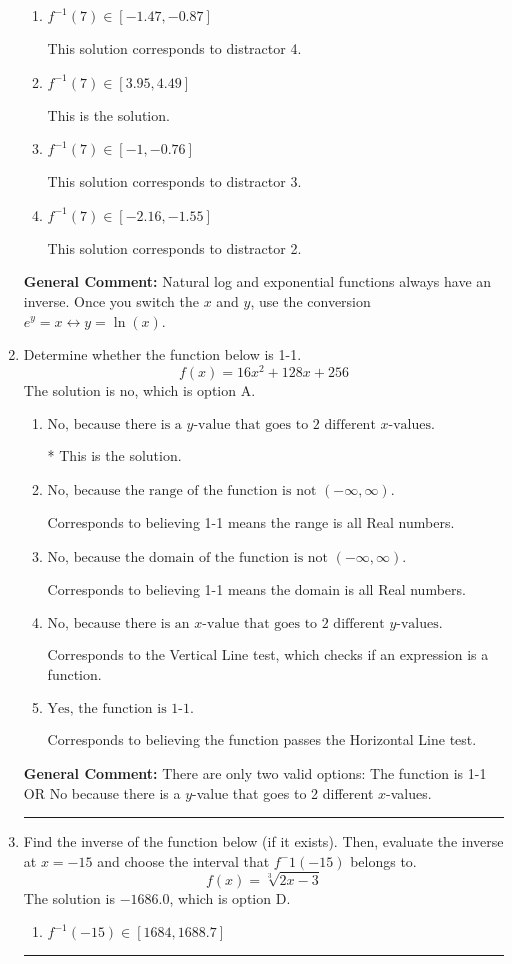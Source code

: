 \documentclass{extbook}[14pt]
\newcommand{\litem}[1]{\item #1

\rule{\textwidth}{0.4pt}}
\begin{document}
\begin{enumerate}
{\begin{enumerate}[label=\Alph*.]
 This solution corresponds to distractor 1.
\item \( f^{-1}(7) \in [-1.47, -0.87] \)

 This solution corresponds to distractor 4.
\item \( f^{-1}(7) \in [3.95, 4.49] \)

 This is the solution.
\item \( f^{-1}(7) \in [-1, -0.76] \)

 This solution corresponds to distractor 3.
\item \( f^{-1}(7) \in [-2.16, -1.55] \)

 This solution corresponds to distractor 2.
\end{enumerate}

\textbf{General Comment:} Natural log and exponential functions always have an inverse. Once you switch the $x$ and $y$, use the conversion $ e^y = x \leftrightarrow y=\ln(x)$.
}
\litem{
Determine whether the function below is 1-1.
\[ f(x) = 16 x^2 + 128 x + 256 \]The solution is \( \text{no} \), which is option A.\begin{enumerate}[label=\Alph*.]
\item \( \text{No, because there is a $y$-value that goes to 2 different $x$-values.} \)

* This is the solution.
\item \( \text{No, because the range of the function is not $(-\infty, \infty)$.} \)

Corresponds to believing 1-1 means the range is all Real numbers.
\item \( \text{No, because the domain of the function is not $(-\infty, \infty)$.} \)

Corresponds to believing 1-1 means the domain is all Real numbers.
\item \( \text{No, because there is an $x$-value that goes to 2 different $y$-values.} \)

Corresponds to the Vertical Line test, which checks if an expression is a function.
\item \( \text{Yes, the function is 1-1.} \)

Corresponds to believing the function passes the Horizontal Line test.
\end{enumerate}

\textbf{General Comment:} There are only two valid options: The function is 1-1 OR No because there is a $y$-value that goes to 2 different $x$-values.
}
\litem{
Find the inverse of the function below (if it exists). Then, evaluate the inverse at $x = -15$ and choose the interval that $f^-1(-15)$ belongs to.
\[ f(x) = \sqrt[3]{2 x - 3} \]The solution is \( -1686.0 \), which is option D.\begin{enumerate}[label=\Alph*.]
\item \( f^{-1}(-15) \in [1684, 1688.7] \)


\end{enumerate}}
\end{enumerate}
\end{document}

